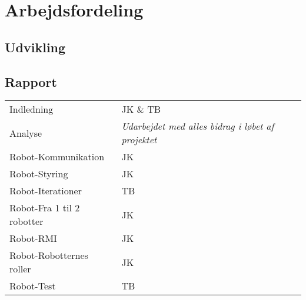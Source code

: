 \chapter{Arbejdsfordeling}\label{app:whodidwhat}
\section*{Udvikling}

\section*{Rapport}
\begin{tabular}{l l}
	Indledning & JK \& TB \\
	Analyse & \textit{Udarbejdet med alles bidrag i løbet af projektet} \\
	Robot-Kommunikation & JK \\
	Robot-Styring & JK \\
	Robot-Iterationer & TB \\
	Robot-Fra 1 til 2 robotter & JK \\
	Robot-RMI & JK \\
	Robot-Robotternes roller & JK \\
	Robot-Test & TB \\
	
\end{tabular}